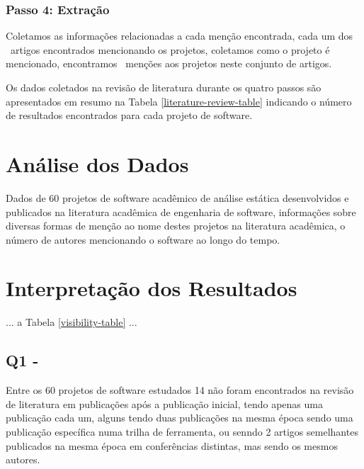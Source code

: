 \subsubsection{Passo 4: Extração}

Coletamos as informações relacionadas a cada menção encontrada, cada um dos
\ScreeningUniqueCount \ artigos encontrados mencionando os projetos, coletamos
como o projeto é mencionado, encontramos \ScreeningCount \ menções aos
projetos neste conjunto de artigos.

Os dados coletados na revisão de literatura durante os quatro passos são
apresentados em resumo na Tabela \ref{literature-review-table} indicando o
número de resultados encontrados para cada projeto de software.



\section{Análise dos Dados} %

Dados de 60 projetos de software acadêmico de análise estática desenvolvidos e
publicados na literatura acadêmica de engenharia de software, informações sobre
diversas formas de menção ao nome destes projetos na literatura acadêmica,
o número de autores mencionando o software ao longo do tempo.

\section{Interpretação dos Resultados} %

... a Tabela \ref{visibility-table} ...



\subsection{Q1 - \EstudoDoisQuestaoUm}



Entre os 60 projetos de software estudados 14 não foram encontrados na revisão
de literatura em publicações após a publicação inicial, tendo apenas uma
publicação cada um, alguns tendo duas publicações na mesma época sendo uma
publicação específica numa trilha de ferramenta, ou senndo 2 artigos
semelhantes publicados na mesma época em conferências distintas, mas sendo os
mesmos autores.

